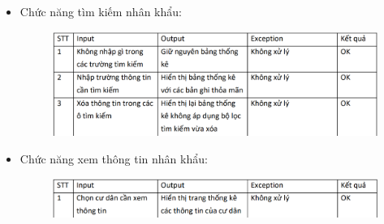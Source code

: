 \documentclass{article}
\begin{document}
\begin{itemize}
\begin{figure}[H]
    \end{figure}
    \vspace{2cm}
    \item Chức năng tìm kiếm nhân khẩu:
    \begin{figure}[H]
        \centering
        \includegraphics[width=1\textwidth]{Kiểm thử nhân khẩu/Screenshot 2024-12-13 235737.png}
    \end{figure}
    \item Chức năng xem thông tin nhân khẩu:
    \begin{figure}[H]
        \centering
        \includegraphics[width=1\textwidth]{Kiểm thử nhân khẩu/Screenshot 2024-12-13 235745.png}
    \end{figure}
\end{itemize}
\end{document}
